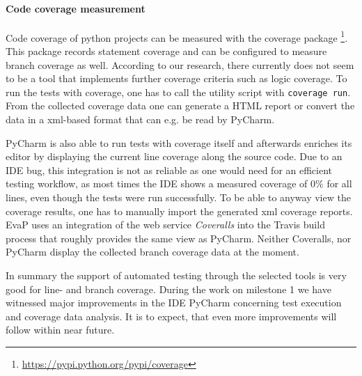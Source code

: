 \paragraph{Code coverage measurement}
Code coverage of python projects can be measured with the coverage package%
\footnote{\url{https://pypi.python.org/pypi/coverage}}.
This package records statement coverage and can be configured to measure branch coverage as well.
According to our research, there currently does not seem to be a tool that implements further coverage criteria such as logic coverage.
To run the tests with coverage, one has to call the utility script with \texttt{coverage run}.
From the collected coverage data one can generate a HTML report or convert the data in a xml-based format that can e.g. be read by PyCharm.

PyCharm is also able to run tests with coverage itself and afterwards enriches its editor by displaying the current line coverage along the source code.
Due to an IDE bug, this integration is not as reliable as one would need for an efficient testing workflow, as most times the IDE shows a measured coverage of 0\% for all lines, even though the tests were run successfully.
To be able to anyway view the coverage results, one has to manually import the generated xml coverage reports.
EvaP uses an integration of the web service \textit{Coveralls} into the Travis build process that roughly provides the same view as PyCharm.
Neither Coveralls, nor PyCharm display the collected branch coverage data at the moment.

In summary the support of automated testing through the selected tools is very good for line- and branch coverage.
During the work on milestone 1 we have witnessed major improvements in the IDE PyCharm concerning test execution and coverage data analysis.
It is to expect, that even more improvements will follow within near future.
